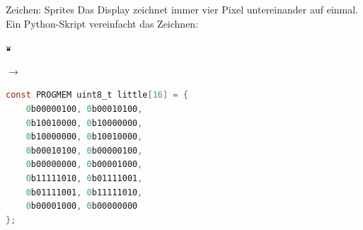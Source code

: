 \documentclass[fleqn]{beamer}
\begin{document}
    \begin{frame}[fragile]{Zeichen: Sprites}
    Das Display zeichnet immer vier Pixel untereinander auf einmal.
    Ein Python-Skript vereinfacht das Zeichnen:
    
    \begin{minipage}{0.2\textwidth}
        \includegraphics[width=\textwidth]{Bilder/little.png}
    \end{minipage}
    \begin{minipage}{0.15\textwidth}
        \centering\huge$\longrightarrow$
    \end{minipage}
    \begin{minipage}{0.6\textwidth}
        \small
        \begin{lstlisting}[language=C]
const PROGMEM uint8_t little[16] = {
    0b00000100, 0b00010100,
    0b10010000, 0b10000000,
    0b10000000, 0b10010000,
    0b00010100, 0b00000100, 
    0b00000000, 0b00001000,
    0b11111010, 0b01111001,
    0b01111001, 0b11111010,
    0b00001000, 0b00000000
};
        \end{lstlisting}
    \end{minipage}
    \end{frame}
\end{document}
